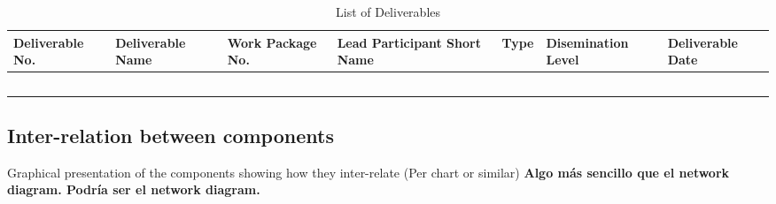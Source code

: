 \begin{longtable}[H]{p{1.8cm} p{2cm} p{1.3cm} p{1.8cm} p{1.3cm} p{2.1cm} p{1.8cm}}
	\toprule[2pt]
	
	\textbf{Deliverable No.} & \textbf{Deliverable Name} & \textbf{Work Package No.} & \textbf{Lead Participant Short Name} & \textbf{Type} & \textbf{Disemination Level} & \textbf{Deliverable Date} \\
	
	\midrule[1.5pt] 
	\endhead
	
	&  &  &  &  &  & \vspace{0.2cm} \\
	
	\midrule

	 &  &  &  &  &  & \vspace{0.2cm} \\
	
	\midrule
	
	 &  &  &  &  &  &  \vspace{0.2cm} \\

	\midrule

 	 &  &  &  &  &  &  \vspace{0.2cm} \\
	
	\bottomrule[2pt]
	
	\caption{List of Deliverables}
	\label{workpackages}
\end{longtable}


\subsection{Inter-relation between components}

Graphical presentation of the components showing how they inter-relate (Per chart or similar) \textbf{Algo más sencillo que el network diagram. Podría ser el network diagram.}


